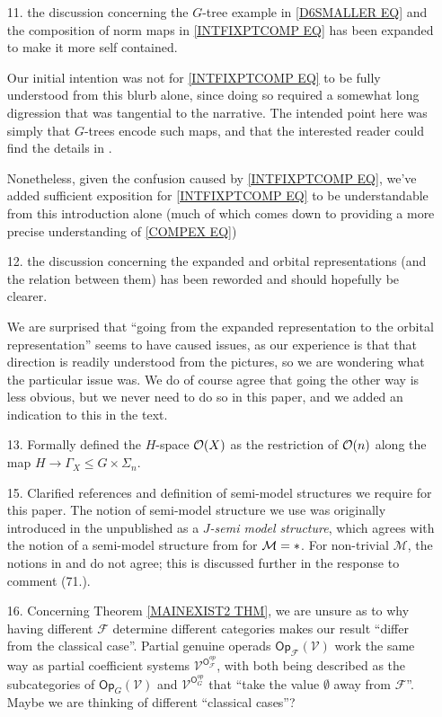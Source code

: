 \documentclass{article}
\begin{document}
\begin{itemize}
	\item[11.] the discussion concerning 
	the $G$-tree example in
	\eqref{D6SMALLER EQ}
	and 
	the composition of norm maps in
	\eqref{INTFIXPTCOMP EQ}
	has been expanded to make it more self contained.
	
	Our initial intention was not for
	\eqref{INTFIXPTCOMP EQ}
	to be fully understood from this blurb alone,
	since doing so required a somewhat long digression 
	that was tangential to the narrative.
	The intended point here
	was simply that $G$-trees encode such maps,
	and that the interested reader could find the details in \cite[\S 4]{Pe17}.
	
	Nonetheless, given the confusion caused by
	\eqref{INTFIXPTCOMP EQ},
	we've added sufficient exposition 
	for \eqref{INTFIXPTCOMP EQ} to be understandable from this introduction alone
	(much of which comes down
	to providing a more precise understanding of
	\eqref{COMPEX EQ})
	
	
	\item[12.] 
	the discussion concerning the expanded and orbital representations (and the relation between them) has been reworded and should hopefully be clearer.
	
	We are surprised that
	``going from the expanded representation to the orbital representation''
	seems to have caused issues, 
	as our experience is that that direction is 
	readily understood from the pictures,
	so we are wondering what the particular issue was.
	We do of course agree that going the other way is less obvious,
	but we never need to do so in this paper,
	and we added an indication to this in the text.
	


  \item[13.] Formally defined the $H$-space $\mathcal{O}(X)$ as the restriction of $\mathcal{O}(n)$ along the map $H \to \Gamma_X \leq G \times \Sigma_n$.
        
	\item[15.] Clarified references and definition of semi-model structures we require for this paper.
	The notion of semi-model structure we use was originally introduced in the unpublished \cite{Spi01} as a \textit{$J$-semi model structure},
	which agrees with the notion of a semi-model structure from \cite{WY18} for $\mathcal M = \**$.
	For non-trivial $\mathcal M$, the notions in \cite{Spi01} and \cite{WY18} do not agree;
	this is discussed further in the response to comment (71.).
	
	\item[16.] Concerning Theorem \ref{MAINEXIST2 THM},
	we are unsure as to why 
	having different $\mathcal{F}$ determine
	different categories makes our result
	``differ from the classical case''. 
	Partial genuine operads $\mathsf{Op}_{\mathcal{F}}(\mathcal{V})$
	work the same way as partial coefficient
	systems $\mathcal{V}^{\mathsf{O}_{\mathcal{F}}^{op}}$,
	with both being described as the subcategories
	of $\mathsf{Op}_{G}(\mathcal{V})$ and
	$\mathcal{V}^{\mathsf{O}_{G}^{op}}$
	that ``take the value $\emptyset$ away from $\mathcal{F}$''.
	Maybe we are thinking of different ``classical cases''? 
	

\end{itemize}
\end{document}
